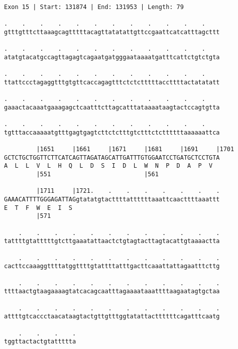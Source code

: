 \documentclass{article}
\begin{document}
\begin{Verbatim}
Exon 15 | Start: 131874 | End: 131953 | Length: 79
 
.    .    .    .    .    .    .    .    .    .    .    .    
gtttgtttcttaaagcagtttttacagttatatattgttccgaattcatcatttagcttt
  
.    .    .    .    .    .    .    .    .    .    .    .    
atatgtacatgccagttagagtcagaatgatgggaataaaatgatttcattctgtctgta
  
.    .    .    .    .    .    .    .    .    .    .    .    
ttattccctagaggtttgtgttcaccagagtttctctctttttaccttttactatatatt
  
.    .    .    .    .    .    .    .    .    .    .    .    
gaaactacaaatgaaagagctcaatttcttagcatttataaaataagtactccagtgtta
  
.    .    .    .    .    .    .    .    .    .    .    .    
tgtttaccaaaaatgtttgagtgagtcttctctttgtctttctcttttttaaaaaattca
  
         |1651     |1661     |1671     |1681     |1691     |1701
GCTCTGCTGGTTCTTCATCAGTTAGATAGCATTGATTTGTGGAATCCTGATGCTCCTGTA
A  L  L  V  L  H  Q  L  D  S  I  D  L  W  N  P  D  A  P  V  
         |551                          |561                 
  
         |1711     |1721.    .    .    .    .    .    .    .
GAAACATTTTGGGAGATTAGgtatatgtacttttattttttaaattcaacttttaaattt
E  T  F  W  E  I  S                                         
         |571                                               
  
    .    .    .    .    .    .    .    .    .    .    .    .
tattttgtatttttgtcttgaaatattaactctgtagtacttagtacattgtaaaactta
  
    .    .    .    .    .    .    .    .    .    .    .    .
cacttccaaaggttttatggttttgtattttatttgacttcaaattattagaatttcttg
  
    .    .    .    .    .    .    .    .    .    .    .    .
ttttaactgtaagaaaagtatcacagcaatttagaaaataaattttaagaatagtgctaa
  
    .    .    .    .    .    .    .    .    .    .    .    .
attttgtcaccctaacataagtactgttgtttggtatattacttttttcagatttcaatg
  
    .    .    .    .
tggttactactgtattttta
\end{Verbatim}
\newpage
\end{document}
